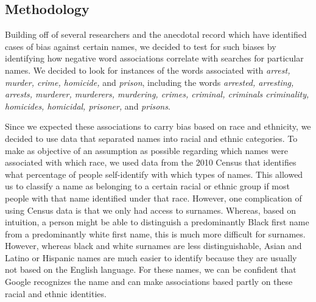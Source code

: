 \documentclass[sigconf]{acmart}
\begin{document}
\subsection{Methodology}

Building off of several researchers and the anecdotal record which have identified cases of bias against certain names, we decided to test for such biases by identifying how negative word associations correlate with searches for particular names. We decided to look for instances of the words associated with {\em arrest, murder, crime, homicide,} and {\em prison}, including the words {\em arrested, arresting, arrests, murderer, murderers, murdering, crimes, criminal, criminals criminality, homicides, homicidal, prisoner,} and {\em prisons}. 

Since we expected these associations to carry bias based on race and ethnicity, we decided to use data that separated names into racial and ethnic categories. To make as objective of an assumption as possible regarding which names were associated with which race, we used data from the 2010 Census that identifies what percentage of people self-identify with which types of names. This allowed us to classify a name as belonging to a certain racial or ethnic group if most people with that name identified under that race. However, one complication of using Census data is that we only had access to surnames. Whereas, based on intuition, a person might be able to distinguish a predominantly Black first name from a predominantly white first name, this is much more difficult for surnames. However, whereas black and white surnames are less distinguishable, Asian and Latino or Hispanic names are much easier to identify because they are usually not based on the English language. For these names, we can be confident that Google recognizes the name and can make associations based partly on these racial and ethnic identities.
\end{document}
